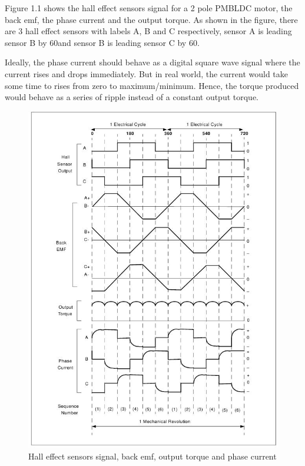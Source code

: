 Figure 1.1 shows the hall effect sensors signal for a 2 pole PMBLDC motor, the back emf, the phase current and the output torque. As shown in the figure, there are 3 hall effect sensors with labels A, B and C respectively, sensor A is leading sensor B by 60\textdegree and sensor B is leading sensor C by 60\textdegree. 


Ideally, the phase current should behave as a digital square wave signal where the current rises and drops immediately. But in real world, the current would take some time to rises from zero to maximum/minimum. Hence, the torque produced would behave as a series of ripple instead of a constant output torque.

\begin{figure}
	\centering
	\includegraphics[width=5.5in]{images/signal.jpg}
	\caption{Hall effect sensors signal, back emf, output torque and phase current \citep{an885}}
\end{figure}

